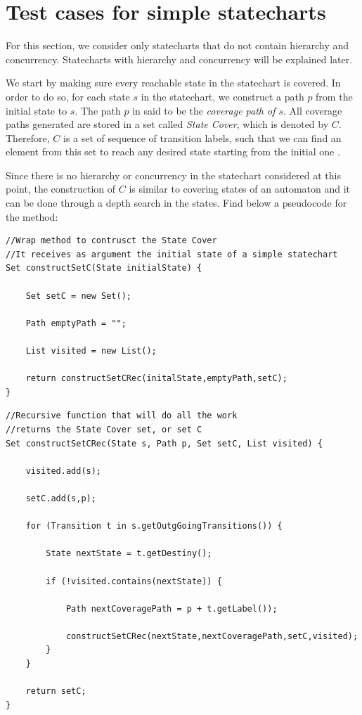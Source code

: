 \section{Test cases for simple statecharts}
\label{testSimpeState}

For this section, we consider only statecharts that do not contain hierarchy and concurrency. Statecharts with hierarchy and concurrency will be explained later.


We start by making sure every reachable state in the statechart is covered. In order to do so, for each state $s$ in the statechart, we construct a path $p$ from the initial state to $s$. The path $p$ in said to be the \textit{coverage path of $s$}. All coverage paths generated are stored in a set called \textit{State Cover}, which is denoted by $C$. Therefore, $C$ is a set of sequence of transition labels, such that we can find an element from this set to reach any desired state starting from the initial one \cite{bogdanov}.

Since there is no hierarchy or concurrency in the statechart considered at this point, the construction of $C$ is similar to covering states of an automaton and it can be done through a depth search in the states. Find below a pseudocode for the method:

\begin{lstlisting}
//Wrap method to contrusct the State Cover
//It receives as argument the initial state of a simple statechart
Set constructSetC(State initialState) {
	
	Set setC = new Set();

	Path emptyPath = "";

	List visited = new List();

	return constructSetCRec(initalState,emptyPath,setC);
}
\end{lstlisting}


\begin{lstlisting}
//Recursive function that will do all the work
//returns the State Cover set, or set C
Set constructSetCRec(State s, Path p, Set setC, List visited) {

	visited.add(s);

	setC.add(s,p);
	
	for (Transition t in s.getOutgGoingTransitions()) {
		
		State nextState = t.getDestiny();

		if (!visited.contains(nextState)) {

			Path nextCoveragePath = p + t.getLabel());

			constructSetCRec(nextState,nextCoveragePath,setC,visited);		
		}
	}
	
	return setC;
}

\end{lstlisting}

